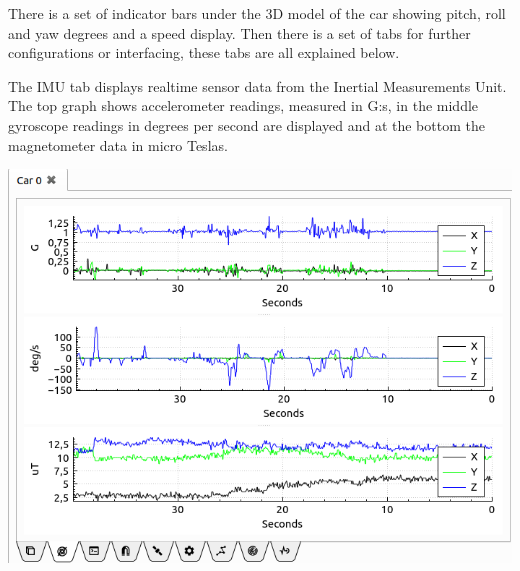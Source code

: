 \documentclass[12pt]{article} %
\begin{document}
There is a set of indicator bars under the 3D model of the car showing
pitch, roll and yaw degrees and a speed display. Then there is a set
of tabs for further configurations or interfacing, these tabs are all
explained below.






\noindent\begin{minipage}{0.5\textwidth} %

 The IMU tab displays realtime sensor data from the Inertial
Measurements Unit. The top graph shows accelerometer readings,
measured in G:s, in the middle gyroscope readings in degrees per
second are displayed and at the bottom the magnetometer data in micro
Teslas.

\end{minipage}
\begin{minipage}{0.5\textwidth}
      \noindent \includegraphics[width=\textwidth]{./screens/Car_IMU_realtime.png}
\end{minipage}

\end{document}
